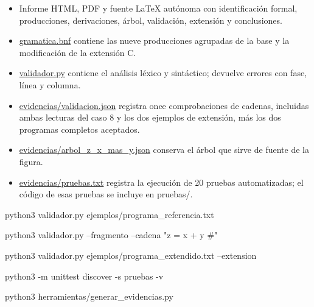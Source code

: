 \documentclass[10pt,a4paper]{article}
\newcommand{\ReportHeading}[1]{\par\addvspace{6pt}{\color{Accent}\bfseries\fontsize{10.8}{14}\selectfont #1\par}\nobreak\vspace{2pt}}
\begin{document}
\begin{itemize}[leftmargin=13pt,itemsep=3pt,topsep=3pt,parsep=0pt]

\item Informe HTML, PDF y fuente LaTeX autónoma con identificación formal, producciones, derivaciones, árbol, validación, extensión y conclusiones.

\item \href{https://drive.google.com/file/d/17ewYfIYOjwTXuDbU1OAsBNICsJnZHuss/view}{gramatica.bnf} contiene las nueve producciones agrupadas de la base y la modificación de la extensión C.

\item \href{https://drive.google.com/file/d/15_pCDRy1ZVEiERgstFPbCUh0AQehxTIB/view}{validador.py} contiene el análisis léxico y sintáctico; devuelve errores con fase, línea y columna.

\item \href{https://drive.google.com/file/d/11CZZWyp0hWTD__QrImJzayKnr4Ma42wF/view}{evidencias/\allowbreak{}validacion.json} registra once comprobaciones de cadenas, incluidas ambas lecturas del caso 8 y los dos ejemplos de extensión, más los dos programas completos aceptados.

\item \href{https://drive.google.com/file/d/1FfMsvVMZ8VBfOz0pYUDTUURfInJlWc4a/view}{evidencias/\allowbreak{}arbol\_\allowbreak{}z\_\allowbreak{}x\_\allowbreak{}mas\_\allowbreak{}y.json} conserva el árbol que sirve de fuente de la figura.

\item \href{https://drive.google.com/file/d/1EoAHXeO2O1gblCPRnflsFjsVPS1Lzjz5/view}{evidencias/\allowbreak{}pruebas.txt} registra la ejecución de 20 pruebas automatizadas; el código de esas pruebas se incluye en pruebas/\allowbreak{}.

\end{itemize}

\ReportHeading{Cómo repetir la comprobación}

\begingroup\setlength{\fboxsep}{6pt}
\noindent\colorbox{CodeBg}{%
\begin{minipage}{\dimexpr\linewidth-2\fboxsep\relax}
\ttfamily\fontsize{8.0}{10.5}\selectfont\raggedright
\setlength{\parindent}{0pt}\setlength{\parskip}{0pt}
\strut{}python3 validador.py ejemplos/programa\_referencia.txt\par
\strut{}python3 validador.py --fragmento --cadena "z = x + y \#"\par
\strut{}python3 validador.py ejemplos/programa\_extendido.txt --extension\par
\strut{}python3 -m unittest discover -s pruebas -v\par
\strut{}python3 herramientas/generar\_evidencias.py\par
\end{minipage}}\par\endgroup\vspace{5pt}
\end{document}
